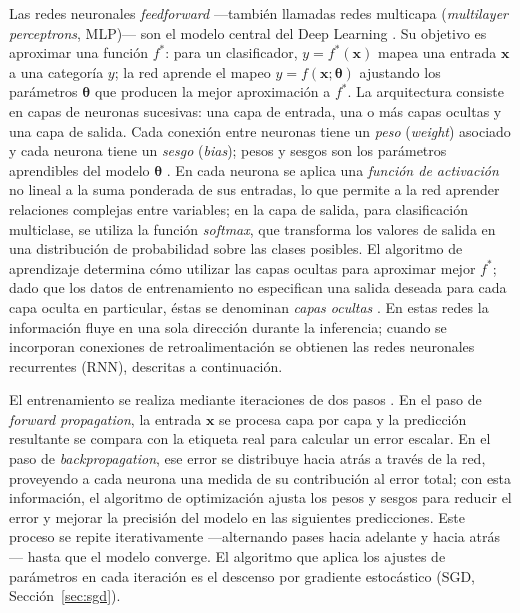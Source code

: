 \documentclass[11pt,a4paper]{article}
\begin{document}
Las redes neuronales \emph{feedforward} —también llamadas redes multicapa (\textit{multilayer perceptrons}, MLP)— son el modelo central del Deep Learning \cite{goodfellow2016}. Su objetivo es aproximar una función $f^*$: para un clasificador, $y = f^*(\mathbf{x})$ mapea una entrada $\mathbf{x}$ a una categoría $y$; la red aprende el mapeo $y = f(\mathbf{x};\boldsymbol{\theta})$ ajustando los parámetros $\boldsymbol{\theta}$ que producen la mejor aproximación a $f^*$. La arquitectura consiste en capas de neuronas sucesivas: una capa de entrada, una o más capas ocultas y una capa de salida. Cada conexión entre neuronas tiene un \emph{peso} (\textit{weight}) asociado y cada neurona tiene un \emph{sesgo} (\textit{bias}); pesos y sesgos son los parámetros aprendibles del modelo $\boldsymbol{\theta}$ \cite{goodfellow2016}. En cada neurona se aplica una \emph{función de activación} no lineal a la suma ponderada de sus entradas, lo que permite a la red aprender relaciones complejas entre variables; en la capa de salida, para clasificación multiclase, se utiliza la función \emph{softmax}, que transforma los valores de salida en una distribución de probabilidad sobre las clases posibles. El algoritmo de aprendizaje determina cómo utilizar las capas ocultas para aproximar mejor $f^*$; dado que los datos de entrenamiento no especifican una salida deseada para cada capa oculta en particular, éstas se denominan \emph{capas ocultas} \cite{goodfellow2016}. En estas redes la información fluye en una sola dirección durante la inferencia; cuando se incorporan conexiones de retroalimentación se obtienen las redes neuronales recurrentes (RNN), descritas a continuación.

El entrenamiento se realiza mediante iteraciones de dos pasos \cite{goodfellow2016}. En el paso de \emph{forward propagation}, la entrada $\mathbf{x}$ se procesa capa por capa y la predicción resultante se compara con la etiqueta real para calcular un error escalar. En el paso de \emph{backpropagation}, ese error se distribuye hacia atrás a través de la red, proveyendo a cada neurona una medida de su contribución al error total; con esta información, el algoritmo de optimización ajusta los pesos y sesgos para reducir el error y mejorar la precisión del modelo en las siguientes predicciones. Este proceso se repite iterativamente ---alternando pases hacia adelante y hacia atrás--- hasta que el modelo converge. El algoritmo que aplica los ajustes de parámetros en cada iteración es el descenso por gradiente estocástico (SGD, Sección~\ref{sec:sgd}).
\end{document}

